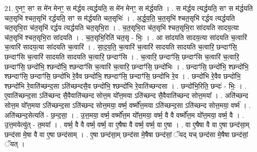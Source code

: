 \documentclass[17pt]{extarticle}
\begin{document}
21. ए॒नꣳ॒॒ सꣳ स मे॑न मेनꣳ॒॒ स म॑र्द्धय त्यर्द्धयति॒ स मे॑न मेनꣳ॒॒ स म॑र्द्धयति । . स म॑र्द्धय त्यर्द्धयति॒ सꣳ स म॑र्द्धयति चत॒सृभि॑ श्चत॒सृभि॑ रर्द्धयति॒ सꣳ स म॑र्द्धयति चत॒सृभिः॑ । . अ॒र्द्ध॒य॒ति॒ च॒त॒सृभि॑ श्चत॒सृभि॑ रर्द्धय त्यर्द्धयति चत॒सृभि॒रा च॑त॒सृभि॑ रर्द्धय त्यर्द्धयति चत॒सृभि॒रा । . च॒त॒सृभि॒रा च॑त॒सृभि॑ श्चत॒सृभि॒रा सा॑दयति सादय॒त्या च॑त॒सृभि॑ श्चत॒सृभि॒रा सा॑दयति । . च॒त॒सृभि॒रिति॑ चत॒सृ - भिः॒ । . आ सा॑दयति सादय॒त्या सा॑दयति च॒त्वारि॑ च॒त्वारि॑ सादय॒त्या सा॑दयति च॒त्वारि॑ । . सा॒द॒य॒ति॒ च॒त्वारि॑ च॒त्वारि॑ सादयति सादयति च॒त्वारि॒ छन्दाꣳ॑सि॒ छन्दाꣳ॑सि च॒त्वारि॑ सादयति सादयति च॒त्वारि॒ छन्दाꣳ॑सि । . च॒त्वारि॒ छन्दाꣳ॑सि॒ छन्दाꣳ॑सि च॒त्वारि॑ च॒त्वारि॒ छन्दाꣳ॑सि॒ छन्दो॑भि॒ श्छन्दो॑भि॒ श्छन्दाꣳ॑सि च॒त्वारि॑ च॒त्वारि॒ छन्दाꣳ॑सि॒ छन्दो॑भिः । . छन्दाꣳ॑सि॒ छन्दो॑भि॒ श्छन्दो॑भि॒ श्छन्दाꣳ॑सि॒ छन्दाꣳ॑सि॒ छन्दो॑भि रे॒वैव छन्दो॑भि॒ श्छन्दाꣳ॑सि॒ छन्दाꣳ॑सि॒ छन्दो॑भि रे॒व । . छन्दो॑भि रे॒वैव छन्दो॑भि॒ श्छन्दो॑भि रे॒वाति॑च्छन्द॒सा ऽति॑च्छन्दसै॒व छन्दो॑भि॒ श्छन्दो॑भि रे॒वाति॑च्छन्दसा । . छन्दो॑भि॒रिति॒ छन्दः॑ - भिः॒ । . ए॒वाति॑च्छन्द॒सा ऽति॑च्छन्द सै॒वैवाति॑च्छन्द सोत्त॒म यो᳚त्त॒मया ऽति॑च्छन्द सै॒वैवाति॑च्छन्द सोत्त॒मया᳚ । . अति॑च्छन्द सोत्त॒म यो᳚त्त॒मया ऽति॑च्छन्द॒सा ऽति॑च्छन्द सोत्त॒मया॒ वर्ष्म॒ वर्ष्मो᳚त्त॒मया ऽति॑च्छन्द॒सा ऽति॑च्छन्द सोत्त॒मया॒ वर्ष्म॑ । . अति॑च्छन्द॒सेत्यति॑ - छ॒न्द॒सा॒ । . उ॒त्त॒मया॒ वर्ष्म॒ वर्ष्मो᳚त्त॒म यो᳚त्त॒मया॒ वर्ष्म॒ वै वै वर्ष्मो᳚त्त॒म यो᳚त्त॒मया॒ वर्ष्म॒ वै । . उ॒त्त॒मयेत्यु॑त् - त॒मया᳚ । . वर्ष्म॒ वै वै वर्ष्म॒ वर्ष्म॒ वा ए॒षैषा वै वर्ष्म॒ वर्ष्म॒ वा ए॒षा । . वा ए॒षैषा वै वा ए॒षा छन्द॑सा॒म् छन्द॑सा मे॒षा वै वा ए॒षा छन्द॑साम् । . ए॒षा छन्द॑सा॒म् छन्द॑सा मे॒षैषा छन्द॑सां॒ ॅयद् यच् छन्द॑सा मे॒षैषा छन्द॑सां॒ ॅयत् । \newline
\end{document}
